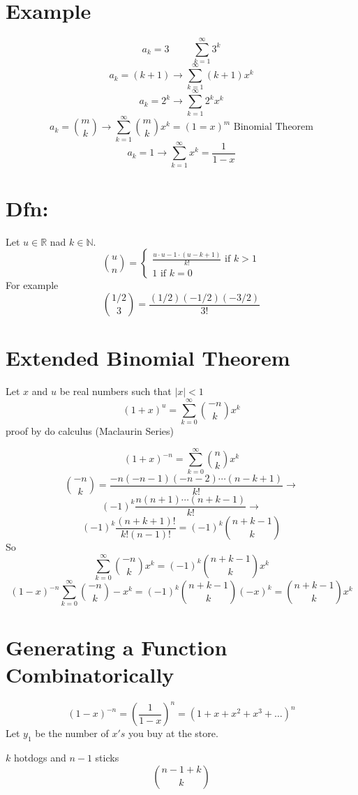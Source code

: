 \documentclass{report}
\begin{document}
\section{Example}
\[
a_k = 3
\hspace{1cm}
\sum^\infty_{k = 1}3^k
\]
\[
a_k = (k+1) 
\longrightarrow
\sum^\infty_{k = 1} (k + 1) x^k
\]
\[
a_k = 2^k
\longrightarrow
\sum^\infty_{k = 1} 2^k x^k
\]
\[
a_k = {m \choose k}
\longrightarrow
\sum^\infty_{k = 1} {m \choose k} x^k = (1 = x)^m
\textrm{ Binomial Theorem}
\]
\[
a_k = 1
\longrightarrow
\sum^\infty_{k = 1} x^k = \frac{1}{1-x}
\]

\section{Dfn:}
Let $u \in \mathbb{R}$ nad $k \in \mathbb{N}$.
\[
{u \choose n} = 
\begin{cases}
\frac{u \cdot u - 1 \cdot (u - k + 1)}{k!} \textrm{ if $k > 1$}\\
1 \textrm{ if $k = 0$}
\end{cases}
\]
For example
\[
{1/2 \choose 3} = \frac{(1/2)(-1/2)(-3/2)}{3!}
\]

\section{Extended Binomial Theorem}
Let $x$ and $u$ be real numbers such that $|x| < 1$
\[
(1 + x)^u = \sum^\infty_{k = 0} {-n \choose k} x^k
\]
proof by do calculus (Maclaurin Series)

\[
(1 + x)^{-n} = \sum^\infty_{k = 0} {n \choose k} x^k
\]
\[
{-n \choose k} = \frac{-n (-n - 1) (-n - 2) \cdots (n-k+1)}{k!} \rightarrow
\]
\[
(-1)^k \frac{n (n + 1) \cdots (n + k - 1)}{k!}
\rightarrow 
\]
\[
(-1)^k \frac{(n+k+1)!}{k!(n-1)!} = (-1)^k {n+k-1 \choose k}
\]
So
\[
 \sum^\infty_{k = 0} {-n \choose k} x^k
=
(-1)^k {n + k - 1 \choose k}x^k
\]
\[
(1 - x)^{-n}
 \sum^\infty_{k = 0} {-n \choose k} -x^k
=
(-1)^k {n + k - 1 \choose k}(-x)^k
=
 {n + k - 1 \choose k}x^k
\]


\section{Generating a Function Combinatorically}
\[
(1 - x)^{-n} = \left( \frac{1}{1-x} \right)^n = (1+x+x^2+x^3+\ldots)^n
\]
Let $y_1$ be the number of $x's$ you buy at the store.

$k$ hotdogs and $n - 1$ sticks
\[
{n - 1 + k \choose k}
\]
\end{document}
